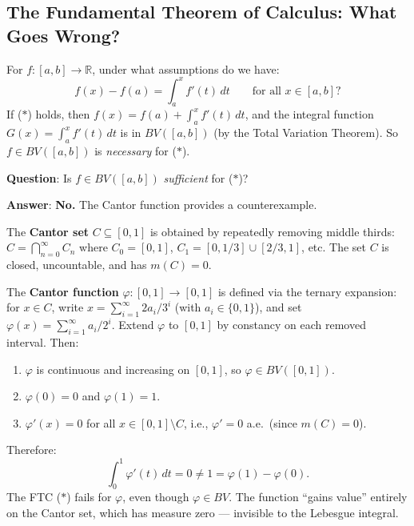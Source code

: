 \documentclass[11pt]{report}
\begin{document}
\subsection{The Fundamental Theorem of Calculus: What Goes Wrong?}

\begin{rembox}
For $f: [a, b] \to \mathbb{R}$, under what assumptions do we have:
\[
f(x) - f(a) = \int_a^x f'(t)\,dt \qquad \text{for all } x \in [a, b]? \tag{$*$}
\]
If ($*$) holds, then $f(x) = f(a) + \int_a^x f'(t)\,dt$, and the integral function $G(x) = \int_a^x f'(t)\,dt$ is in $BV([a, b])$ (by the Total Variation Theorem). So $f \in BV([a, b])$ is \textit{necessary} for ($*$).

\textbf{Question}: Is $f \in BV([a, b])$ \textit{sufficient} for ($*$)?

\textbf{Answer}: \textbf{No.} The Cantor function provides a counterexample.
\end{rembox}

\begin{exbox}
The \textbf{Cantor set} $C \subseteq [0, 1]$ is obtained by repeatedly removing middle thirds: $C = \bigcap_{n=0}^{\infty} C_n$ where $C_0 = [0,1]$, $C_1 = [0, 1/3] \cup [2/3, 1]$, etc. The set $C$ is closed, uncountable, and has $m(C) = 0$.

The \textbf{Cantor function} $\varphi: [0, 1] \to [0, 1]$ is defined via the ternary expansion: for $x \in C$, write $x = \sum_{i=1}^{\infty} 2a_i / 3^i$ (with $a_i \in \{0, 1\}$), and set $\varphi(x) = \sum_{i=1}^{\infty} a_i / 2^i$. Extend $\varphi$ to $[0, 1]$ by constancy on each removed interval. Then:

\begin{enumerate}[label=(\roman*)]
\item $\varphi$ is continuous and increasing on $[0, 1]$, so $\varphi \in BV([0, 1])$.
\item $\varphi(0) = 0$ and $\varphi(1) = 1$.
\item $\varphi'(x) = 0$ for all $x \in [0, 1] \setminus C$, i.e., $\varphi' = 0$ a.e.\ (since $m(C) = 0$).
\end{enumerate}

Therefore:
\[
\int_0^1 \varphi'(t)\,dt = 0 \neq 1 = \varphi(1) - \varphi(0).
\]
The FTC ($*$) fails for $\varphi$, even though $\varphi \in BV$. The function ``gains value'' entirely on the Cantor set, which has measure zero --- invisible to the Lebesgue integral.
\end{exbox}
\end{document}

